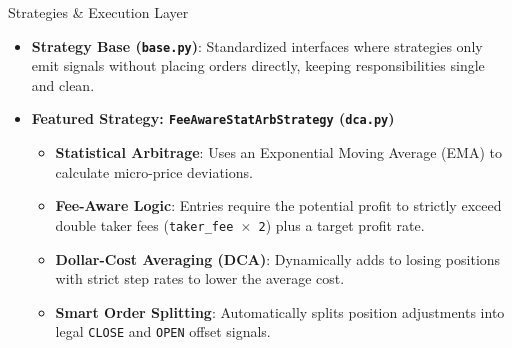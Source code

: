 \documentclass{beamer}
\begin{document}
\begin{frame}{Strategies \& Execution Layer}
    \begin{itemize}
        \item \textbf{Strategy Base (\texttt{base.py})}: Standardized interfaces where strategies only emit signals without placing orders directly, keeping responsibilities single and clean.
        \item \textbf{Featured Strategy: \texttt{FeeAwareStatArbStrategy} (\texttt{dca.py})}
        \begin{itemize}
            \item \textbf{Statistical Arbitrage}: Uses an Exponential Moving Average (EMA) to calculate micro-price deviations.
            \item \textbf{Fee-Aware Logic}: Entries require the potential profit to strictly exceed double taker fees (\texttt{taker\_fee $\times$ 2}) plus a target profit rate.
            \item \textbf{Dollar-Cost Averaging (DCA)}: Dynamically adds to losing positions with strict step rates to lower the average cost.
            \item \textbf{Smart Order Splitting}: Automatically splits position adjustments into legal \texttt{CLOSE} and \texttt{OPEN} offset signals.
        \end{itemize}
    \end{itemize}
\end{frame}
\end{document}
